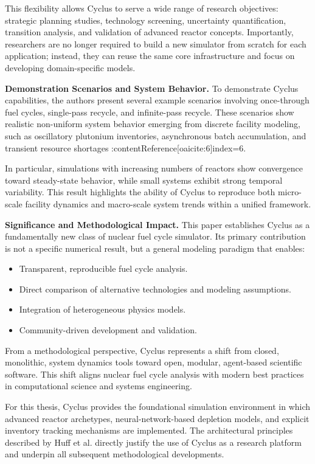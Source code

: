 This flexibility allows Cyclus to serve a wide range of research objectives: strategic planning studies, technology 
screening, uncertainty quantification, transition analysis, and validation of advanced reactor concepts. Importantly, 
researchers are no longer required to build a new simulator from scratch for each application; instead, they can reuse 
the same core infrastructure and focus on developing domain-specific models.

\textbf{Demonstration Scenarios and System Behavior.}  
To demonstrate Cyclus capabilities, the authors present several example scenarios involving once-through fuel cycles, 
single-pass recycle, and infinite-pass recycle. These scenarios show realistic non-uniform system behavior emerging 
from discrete facility modeling, such as oscillatory plutonium inventories, asynchronous batch accumulation, and transient
resource shortages :contentReference[oaicite:6]{index=6}.

In particular, simulations with increasing numbers of reactors show convergence toward steady-state behavior, while small 
systems exhibit strong temporal variability. This result highlights the ability of Cyclus to reproduce both micro-scale 
facility dynamics and macro-scale system trends within a unified framework.

\textbf{Significance and Methodological Impact.}  
This paper establishes Cyclus as a fundamentally new class of nuclear fuel cycle simulator. Its primary contribution is 
not a specific numerical result, but a general modeling paradigm that enables:
\begin{itemize}
    \item Transparent, reproducible fuel cycle analysis.
    \item Direct comparison of alternative technologies and modeling assumptions.
    \item Integration of heterogeneous physics models.
    \item Community-driven development and validation.
\end{itemize}

From a methodological perspective, Cyclus represents a shift from closed, monolithic, system dynamics tools toward open, 
modular, agent-based scientific software. This shift aligns nuclear fuel cycle analysis with modern best practices in 
computational science and systems engineering.

For this thesis, Cyclus provides the foundational simulation environment in which advanced reactor archetypes, 
neural-network-based depletion models, and explicit inventory tracking mechanisms are implemented. The architectural 
principles described by Huff et al. directly justify the use of Cyclus as a research platform and underpin all subsequent 
methodological developments.


